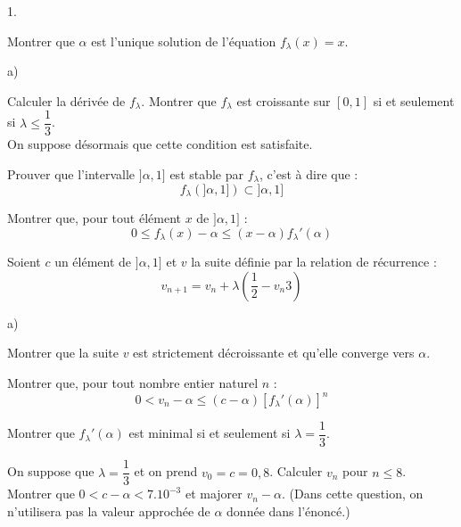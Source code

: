 \documentclass[11pt]{article}%
\begin{document}
\begin{noliste}{1.}
 \setlength{\itemsep}{4mm}
\item Montrer que $\alpha $ est l'unique solution de l'équation
$f_{\lambda
}(x) = x$. 

\item 

\begin{noliste}{a)}
 \setlength{\itemsep}{2mm}
\item Calculer la dérivée de $f_{\lambda }$. Montrer que $f_{\lambda }$
est
croissante sur $[0,1]$ si et seulement si $\lambda \leq \dfrac{1}{3}$. 
\\
On suppose désormais que cette condition est satisfaite. 

\item Prouver que l'intervalle $]\alpha,1]$ est stable par $f_{\lambda
}$,
c'est à dire que : 
\[
f_{\lambda }(]\alpha,1])\subset ]\alpha,1]
\]

\item Montrer que, pour tout élément $x$ de $]\alpha,1]$ : 
\[
0\leq f_{\lambda }(x)-\alpha \leq (x-\alpha )f_{\lambda }{\prime
}(\alpha )
\]
\end{noliste}

\item Soient $c$ un élément de $]\alpha,1]$ et $v$ la suite définie par
la
relation de récurrence : 
\[
v_{n + 1} = v_{n} + \lambda \left( \frac{1}{2}-v_{n}{3}\right) 
\]

\begin{noliste}{a)}
 \setlength{\itemsep}{2mm}
\item Montrer que la suite $v$ est strictement décroissante et qu'elle
converge vers $\alpha $. 

\item Montrer que, pour tout nombre entier naturel $n$ : 
\[
0<v_{n}-\alpha \leq (c-\alpha )\left[ f_{\lambda }{\prime }(\alpha
)\right] ^{n}
\]

\item Montrer que $f_{\lambda }{\prime }(\alpha )$ est minimal si et
seulement si $\lambda = \dfrac{1}{3}$. 
\end{noliste}

\item On suppose que $\lambda = \dfrac{1}{3}$ et on prend $v_{0} = c =
0,8$.
Calculer $v_{n}$ pour $n\leq 8$.\\
Montrer que $0<c-\alpha <7.10^{-3}$ et majorer $v_{n}-\alpha $. (Dans
cette
question, on n'utilisera pas la valeur approchée de $\alpha $ donnée
dans l'énoncé.) 
\end{noliste}
\end{document}
